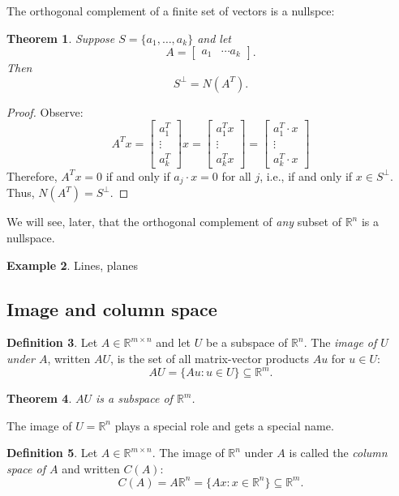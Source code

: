 \documentclass[fullpage]{amsart}
\newcommand{\RR}{\mathbb{R}}
\newtheorem{theorem}{Theorem}[section]
\theoremstyle{definition}
\newtheorem{definition}[theorem]{Definition}
\newtheorem{example}[theorem]{Example}
\begin{document}
The orthogonal complement of a finite set of vectors is a nullspce:
\begin{theorem}
Suppose $S=\{a_1,\ldots,a_k\}$ and let $$A=\begin{bmatrix}a_1&\cdots a_k\end{bmatrix}.$$
Then 
$$S^\perp = N(A^T).$$
\end{theorem}

\begin{proof} Observe:
$$A^Tx=
\begin{bmatrix}a_1^T\\\vdots\\a_k^T\end{bmatrix}x
=\begin{bmatrix}a_1^Tx\\\vdots\\a_k^Tx\end{bmatrix}
=\begin{bmatrix}a_1^T\cdot x\\\vdots\\a_k^T\cdot x\end{bmatrix}$$
  Therefore, $A^Tx=0$ if and only if $a_j\cdot x=0$ for all $j$, i.e., if and only if $x\in S^\perp$.
  Thus, $N(A^T) = S^\perp$.
\end{proof}

We will see, later, that the orthogonal complement of \emph{any} subset of $\RR^n$ is a nullspace.

\begin{example}
  Lines, planes
\end{example}

\subsection{Image and column space}

\begin{definition}
  Let $A\in\RR^{m\times n}$ and let $U$ be a subspace of $\RR^n$.
The \emph{image of $U$ under $A$}, written $AU$, is the set of all matrix-vector products $Au$ for $u\in U$:
$$
AU = \{Au : u\in U\}\subseteq \RR^m.
$$
\end{definition}

\begin{theorem}
  $AU$ is a subspace of $\RR^m$.
\end{theorem}

The image of $U=\RR^n$ plays a special role and gets a special name.
\begin{definition}
  Let $A\in \RR^{m\times n}$. The image of $\RR^n$ under $A$ is called the \emph{column space of $A$} and written $C(A)$:
  $$
  C(A) = A\RR^n = \{Ax : x\in\RR^n\}\subseteq\RR^m.
  $$
\end{definition}
\end{document}
